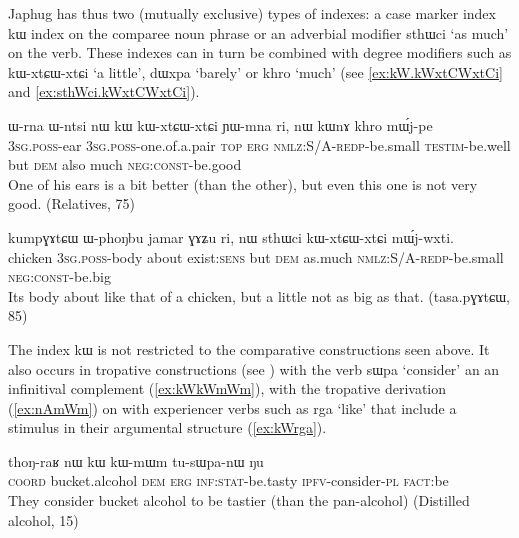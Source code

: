 \documentclass[oldfontcommands,oneside,a4paper,11pt]{article}
\newcommand{\ipa}[1]{{\phon #1}} %
\begin{document}
Japhug has thus two (mutually exclusive) types of indexes: a case marker index \ipa{kɯ} index on the comparee noun phrase or an adverbial modifier \ipa{sthɯci} `as much' on the verb. These indexes can in turn be combined with degree modifiers such as \ipa{kɯ-xtɕɯ-xtɕi} `a little', \ipa{dɯxpa} `barely' or \ipa{khro} `much' (see \ref{ex:kW.kWxtCWxtCi} and \ref{ex:sthWci.kWxtCWxtCi}).
  
    \begin{exe}
\ex \label{ex:kW.kWxtCWxtCi}
\gll 
  \ipa{ɯ-rna}  	\ipa{ɯ-ntsi}  	\ipa{nɯ}  	\ipa{kɯ}  	\ipa{kɯ-xtɕɯ-xtɕi}  	\ipa{ɲɯ-mna}  	\ipa{ri,}  	\ipa{nɯ}  	\ipa{kɯnɤ}  	\ipa{khro}  	\ipa{mɯ́j-pe}  \\
  \textsc{3sg.poss}-ear \textsc{3sg.poss}-one.of.a.pair \textsc{top} \textsc{erg} \textsc{nmlz:S/A-redp}-be.small \textsc{testim}-be.well but \textsc{dem} also much \textsc{neg:const}-be.good \\
  \glt One of his ears is a bit better (than the other), but even this one is not very good.   (Relatives, 75)
  \end{exe}
 
     \begin{exe}
\ex \label{ex:sthWci.kWxtCWxtCi}
\gll 
  \ipa{kumpɣɤtɕɯ}  	\ipa{ɯ-phoŋbu}  	\ipa{jamar}  	\ipa{ɣɤʑu}  	\ipa{ri,}  	\ipa{nɯ}  	\ipa{sthɯci}  	\ipa{kɯ-xtɕɯ-xtɕi}  	\ipa{mɯ́j-wxti.}  \\
  chicken \textsc{3sg.poss}-body about exist:\textsc{sens} but \textsc{dem} as.much \textsc{nmlz:S/A-redp}-be.small \textsc{neg:const}-be.big \\
\glt Its body about like that of a chicken, but a little not as big as that. (tasa.pɣɤtɕɯ, 85)
  \end{exe}

 
The index \ipa{kɯ} is not restricted to the comparative constructions seen above. It also occurs in  tropative constructions (see \citealt{jacques13tropative}) with the verb \ipa{sɯpa} `consider' an an infinitival complement (\ref{ex:kWkWmWm}), with the tropative derivation (\ref{ex:nAmWm}) on with experiencer verbs such as \ipa{rga} `like' that include  a stimulus in their argumental structure (\ref{ex:kWrga}).

\begin{exe}
\ex \label{ex:kWkWmWm}
\gll  \ipa{tɕe}   	\ipa{thoŋ-raʁ}   	\ipa{nɯ}   	\ipa{kɯ}   	\ipa{kɯ-mɯm}   	\ipa{tu-sɯpa-nɯ}   	\ipa{ŋu}   \\
\textsc{coord} bucket.alcohol \textsc{dem} \textsc{erg} \textsc{inf:stat}-be.tasty \textsc{ipfv}-consider-\textsc{pl} \textsc{fact}:be \\
\glt They consider  bucket alcohol to be tastier (than the pan-alcohol) (Distilled alcohol, 15)
\end{exe}
\end{document}
